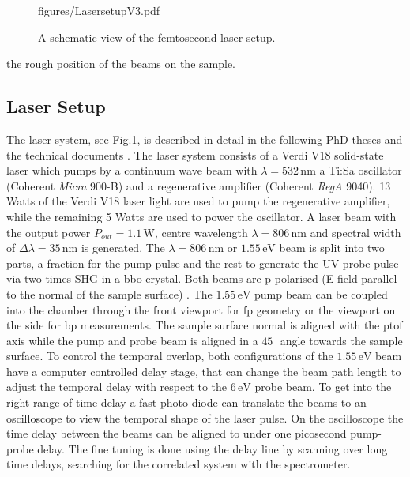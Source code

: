 \documentclass[a4paper,12pt,twoside]{article}
\begin{document}
\begin{figure}
{		{figures/LasersetupV3.pdf}}
		\caption{A schematic view of the femtosecond laser setup.}
	    	\label{Lasersetup}
	\end{figure}
 the rough position of the beams on the sample.    
\subsection{Laser Setup}
\label{LSchap}
The laser system, see Fig.\ref{Lasersetup}, is described in detail in the following PhD theses \cite{Avigo2017,Kirchmann2009} and the technical documents \cite{CoherentInc.2017,Coherent2011}. The laser system consists of a Verdi V18 solid-state laser which pumps by a continuum wave beam with $\lambda = 532\,\mathrm{nm}$ a Ti:Sa oscillator (Coherent \textit{Micra} 900-B) and a regenerative amplifier (Coherent \textit{RegA} 9040). 13 Watts of the Verdi V18 laser light are used to pump the regenerative amplifier, while the remaining 5 Watts are used to power the oscillator. A laser beam with the output power $P_{out}=1.1\,\mathrm{W}$, centre wavelength $\lambda = 806\,\mathrm{nm}$ and spectral width of $\Delta\lambda = 35\,\mathrm{nm}$ is generated. The $\lambda = 806\,\mathrm{nm}$ or $1.55\,\mathrm{eV}$ beam is split into two parts, a fraction for the pump-pulse and the rest to generate the UV probe pulse via two times \gls{SHG} in a \gls{bbo} crystal. Both beams are p-polarised (E-field parallel to the normal of the sample surface) \cite{Syed2018}. The $1.55\,\mathrm{\mbox{eV}}$ pump beam can be coupled into the chamber through the front viewport for \gls{fp} geometry or the viewport on the side for \gls{bp} measurements. The sample surface normal is aligned with the \gls{ptof} axis while the pump and probe beam is aligned in a $45\,$\textdegree\, angle towards the sample surface. To control the temporal overlap, both configurations of the $1.55\,\mathrm{\mbox{eV}}$ beam have a computer controlled delay stage, that can change the beam path length to adjust the temporal delay with respect to the $6\,\mathrm{\mbox{eV}}$ probe beam. To get into the right range of time delay a fast photo-diode can translate the beams to an oscilloscope to view the temporal shape of the laser pulse. On the oscilloscope the time delay between the beams can be aligned to under one picosecond pump-probe delay. The fine tuning is done using the delay line by scanning over long time delays, searching for the correlated system with the spectrometer. 
\end{document}
